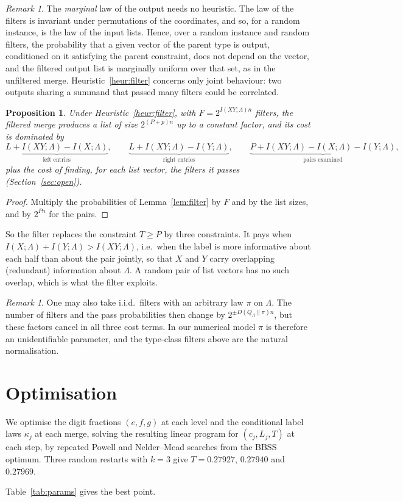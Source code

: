 \documentclass[11pt]{article}
\newtheorem{proposition}[theorem]{Proposition}
\theoremstyle{definition}
\theoremstyle{remark}
\newtheorem{remark}[theorem]{Remark}
\newcommand{\status}[1]{}   %
\begin{document}
\begin{remark}
The \emph{marginal} law of the output needs no heuristic. The law of the filters is invariant under permutations of
the coordinates, and so, for a random instance, is the law of the input lists. Hence, over a random instance and random filters,
the probability that a given vector of the parent type is output, conditioned on it satisfying the parent
constraint, does not depend on the vector, and the filtered output list is marginally uniform over that set, as in
the unfiltered merge. Heuristic~\ref{heur:filter} concerns only joint behaviour: two
outputs sharing a summand that passed many filters could be correlated.
\end{remark}

\begin{proposition}\label{prop:cost}
Under Heuristic~\ref{heur:filter}, with $F=2^{I(XY;\Lambda)n}$ filters, the filtered merge produces a list of size
$2^{(P+p)n}$ up to a constant factor, and its cost is dominated by
\[
\underbrace{L+I(XY;\Lambda)-I(X;\Lambda)}_{\text{left entries}},\qquad
\underbrace{L+I(XY;\Lambda)-I(Y;\Lambda)}_{\text{right entries}},\qquad
\underbrace{P+I(XY;\Lambda)-I(X;\Lambda)-I(Y;\Lambda)}_{\text{pairs examined}},
\]
plus the cost of finding, for each list vector, the filters it passes (Section~\ref{sec:open}).
\end{proposition}
\begin{proof}
Multiply the probabilities of Lemma~\ref{lem:filter} by $F$ and by the list sizes, and by $2^{Pn}$ for the pairs.
\end{proof}

So the filter replaces the constraint $T\ge P$ by three constraints. It pays when
$I(X;\Lambda)+I(Y;\Lambda)>I(XY;\Lambda)$, i.e.\ when the label is more informative about each half than about the
pair jointly, so that $X$ and $Y$ carry overlapping (redundant) information about $\Lambda$. A random pair of list
vectors has no such overlap, which is what the filter exploits.

\begin{remark}
One may also take i.i.d.\ filters with an arbitrary law $\pi$ on $\Lambda$. The number of filters and the pass
probabilities then change by $2^{\pm D(Q_\Lambda\|\pi)n}$, but these factors cancel in all three cost terms. In our
numerical model $\pi$ is therefore an unidentifiable parameter, and the type-class filters above are the natural
normalisation.
\end{remark}

\section{Optimisation}\label{sec:opt}
We optimise the digit fractions $(e,f,g)$ at each level and the conditional label laws $\kappa_j$ at each merge,
solving the resulting linear program for $(c_j,L_j,T)$ at each step, by repeated Powell and Nelder--Mead searches
from the BBSS optimum. Three random restarts with $k=3$ give $T=0.27927$, $0.27940$ and $0.27969$.
\status{numerical; local search only, k=3 only}
Table~\ref{tab:params} gives the best point.
\end{document}
